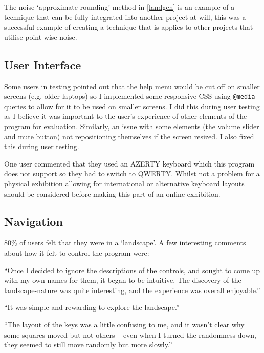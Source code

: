 The noise `approximate rounding' method in \autoref{landgen} is an example of a
technique that can be fully integrated into another project at will, this was a
successful example of creating a technique that is applies to other projects
that utilise point-wise noise.

\subsection{User Interface}
Some users in testing pointed out that the help menu would be cut off on smaller
screens (e.g. older laptops) so I implemented some responsive CSS using
\verb|@media| queries to allow for it to be used on smaller screens. I did this
during user testing as I believe it was important to the user's experience of
other elements of the program for evaluation. Similarly, an issue with some
elements (the volume slider and mute button) not repositioning themselves if the
screen resized. I also fixed this during user testing.

One user commented that they used an AZERTY keyboard which this program does not
support so they had to switch to QWERTY. Whilst not a problem for a physical
exhibition allowing for international or alternative keyboard layouts should be
considered before making this part of an online exhibition.

\subsection{Navigation}
80\% of users felt that they were in a `landscape'. A few interesting comments
about how it felt to control the program were:

\begin{displayquote}
``Once I decided to ignore the descriptions of the controls, and sought to come
up with my own names for them, it began to be intuitive. The discovery of the
landscape-nature was quite interesting, and the experience was overall
enjoyable.''
\end{displayquote}

\begin{displayquote}
``It was simple and rewarding to explore the landscape.''
\end{displayquote}

\begin{displayquote}
``The layout of the keys was a little confusing to me, and it wasn't clear why
some squares moved but not others -- even when I turned the randomness down,
they seemed to still move randomly but more slowly.''
\end{displayquote}

